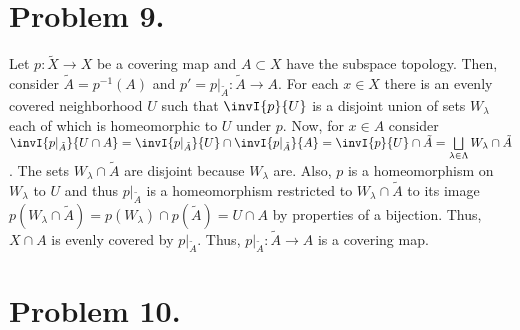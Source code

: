 \documentclass[12pt]{extarticle}
\begin{document}
\section*{Problem 9.}

Let $p : \tilde{X} \to X$ be a covering map and $A \subset X$ have the subspace topology. Then, consider $\tilde{A} = p^{-1}(A)$ and $p' = p|_{\tilde{A}} : \tilde{A} \to A$. For each $x \in X$ there is an evenly covered neighborhood $U$ such that $\invI{p}{U}$ is a disjoint union of sets $W_\lambda$ each of which is homeomorphic to $U$ under $p$. Now, for $x \in A$ consider $\invI{p|_{\tilde{A}}}{U \cap A} = \invI{p|_{\tilde{A}}}{U} \cap \invI{p|_{\tilde{A}}}{A} = \invI{p}{U} \cap \tilde{A} = \bigsqcup\limits_{\lambda \in \Lambda} W_\lambda \cap \tilde{A}$. The sets $W_\lambda \cap \tilde{A}$ are disjoint because $W_\lambda$ are. Also, $p$ is a homeomorphism on $W_\lambda$ to $U$ and thus $p|_{\tilde{A}}$ is a homeomorphism restricted to $W_\lambda \cap \tilde{A}$ to its image $p(W_\lambda \cap \tilde{A}) = p(W_\lambda) \cap p(\tilde{A}) = U \cap A$ by properties of a bijection. Thus, $X \cap A$ is evenly covered by $p|_{\tilde{A}}$. Thus, $p|_{\tilde{A}} : \tilde{A} \to A$ is a covering map.

\section*{Problem 10.}
\end{document}
